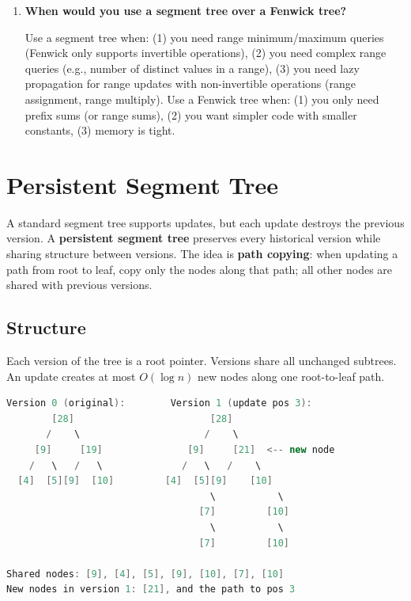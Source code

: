 \begin{enumerate}
\item \textbf{When would you use a segment tree over a Fenwick tree?}

Use a segment tree when: (1) you need range minimum/maximum queries (Fenwick only supports invertible operations), (2) you need complex range queries (e.g., number of distinct values in a range), (3) you need lazy propagation for range updates with non-invertible operations (range assignment, range multiply). Use a Fenwick tree when: (1) you only need prefix sums (or range sums), (2) you want simpler code with smaller constants, (3) memory is tight.
\end{enumerate}

\section{Persistent Segment Tree}

A standard segment tree supports updates, but each update destroys the previous version. A \textbf{persistent segment tree} preserves every historical version while sharing structure between versions. The idea is \textbf{path copying}: when updating a path from root to leaf, copy only the nodes along that path; all other nodes are shared with previous versions.

\subsection{Structure}

Each version of the tree is a root pointer. Versions share all unchanged subtrees. An update creates at most $O(\log n)$ new nodes along one root-to-leaf path.

\begin{lstlisting}[language=Java]
Version 0 (original):        Version 1 (update pos 3):
        [28]                        [28]
       /    \                      /    \
     [9]     [19]               [9]     [21]  <-- new node
    /   \   /   \              /   \   /    \
  [4]  [5][9]  [10]         [4]  [5][9]    [10]
                                    \           \
                                  [7]         [10]
                                    \           \
                                  [7]         [10]

Shared nodes: [9], [4], [5], [9], [10], [7], [10]
New nodes in version 1: [21], and the path to pos 3
\end{lstlisting}

